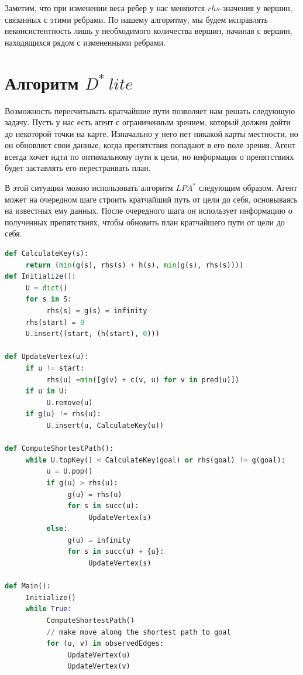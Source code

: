 \documentclass[11pt]{article}
\newcommand{\dstarlite}{\(D^*\ lite\)\,}
\begin{document}
    Заметим, что при изменении веса ребер у нас меняются $rhs$-значения у вершин, связанных с этими ребрами.
    По нашему алгоритму, мы будем исправлять неконсистентность лишь у необходимого количества вершин, начиная с вершин, находящихся рядом с измененными ребрами.


    \section{Алгоритм \dstarlite}
    Возможность пересчитывать кратчайшие пути позволяет нам решать следующую задачу.
    Пусть у нас есть агент с ограниченным зрением, который должен дойти до некоторой точки на карте.
    Изначально у него нет никакой карты местности, но он обновляет свои данные, когда препятствия попадают в его поле зрения.
    Агент всегда хочет идти по оптимальному пути к цели, но информация о препятствиях будет заставлять его перестраивать план.

    В этой ситуации можно использовать алгоритм $LPA^*$ следующим образом.
    Агент может на очередном шаге строить кратчайший путь от цели до себя, основываясь на известных ему данных.
    После очередного шага он использует информацию о полученных препятствиях, чтобы обновить план кратчайшего пути от цели до себя.

    \begin{lstlisting}[language=Python, caption=D* lite ]
def CalculateKey(s):
     return (min(g(s), rhs(s) + h(s), min(g(s), rhs(s))))
def Initialize():
     U = dict()
     for s in S:
          rhs(s) = g(s) = infinity
     rhs(start) = 0
     U.insert((start, (h(start), 0)))

def UpdateVertex(u):
     if u != start:
          rhs(u) =min([g(v) + c(v, u) for v in pred(u)])
     if u in U:
          U.remove(u)
     if g(u) != rhs(u):
          U.insert(u, CalculateKey(u))

def ComputeShortestPath():
     while U.topKey() < CalculateKey(goal) or rhs(goal) != g(goal):
          u = U.pop()
          if g(u) > rhs(u):
               g(u) = rhs(u)
               for s in succ(u):
                    UpdateVertex(s)
          else:
               g(u) = infinity
               for s in succ(u) + {u}:
                    UpdateVertex(s)

def Main():
     Initialize()
     while True:
          ComputeShortestPath()
          // make move along the shortest path to goal
          for (u, v) in observedEdges:
               UpdateVertex(u)
               UpdateVertex(v)
    \end{lstlisting}
\end{document}
